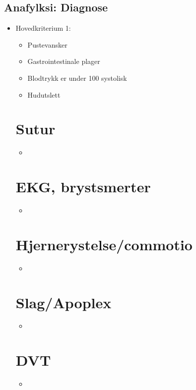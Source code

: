 		\subsection{Anafylksi: Diagnose}
			\begin{itemize}
				\item Hovedkriterium 1:\\ 
					\begin{itemize}
						\item Pustevansker\\
						\item Gastrointestinale plager\\
						\item Blodtrykk er under 100 systolisk\\
						\item Hudutslett\\

			\end{itemize}
	\section{Sutur}
		\begin{itemize}
			\item
		\end{itemize}
	\section{EKG, brystsmerter}
		\begin{itemize}
			\item
		\end{itemize}
	\section{Hjernerystelse/commotio}
		\begin{itemize}
			\item
		\end{itemize}
	\section{Slag/Apoplex}
		\begin{itemize}
			\item
		\end{itemize}
	\section{DVT}
		\begin{itemize}
			\item
		\end{itemize}

\end{itemize}
